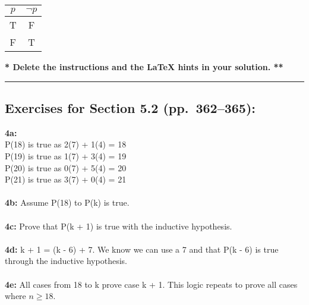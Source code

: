 \documentclass[12pt]{article}  %
\newcommand{\NOT}{\neg}
\begin{document}
\begin{center}
\begin{tabular}{|c|c|}  %
\hline                  %
$p$ & $\NOT p$ \\       %
\hline
\hline
T & F \\
\hline
F & T \\
\hline
\end{tabular}
\end{center}

{\bf ** Delete the instructions and the LaTeX hints in your solution. **}

\rule{6in}{.1pt}       %


\subsection*{Exercises for Section 5.2 (pp.\ 362--365):}     

\noindent
{\bf 4a:}
\\
P(18) is true as 2(7) + 1(4) = 18\\
P(19) is true as 1(7) + 3(4) = 19\\
P(20) is true as 0(7) + 5(4) = 20\\
P(21) is true as 3(7) + 0(4) = 21\\
\\
{\bf 4b:} Assume P(18) to P(k) is true.
\\
\\
{\bf 4c:} Prove that P(k + 1) is true with the inductive hypothesis.
\\
\\
{\bf 4d:} k + 1 = (k - 6) + 7. We know we can use a 7 and that P(k - 6) is 
true through the inductive hypothesis.
\\
\\
{\bf 4e:} All cases from 18 to k prove case k + 1. This logic repeats
to prove all cases where $n \geq 18$.
\end{document}
